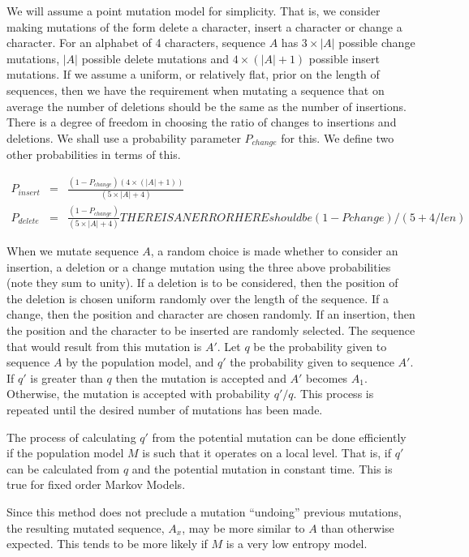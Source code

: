 \documentclass[letterpaper,11pt,oneside]{article}
\begin{document}
We will assume a point mutation model for simplicity.  That is, we consider
making mutations of the form delete a character, insert a character or change
a character.  For an alphabet of 4 characters, sequence $A$ has $3\times|A|$
possible change mutations, $|A|$ possible delete mutations and
$4\times(|A|+1)$ possible insert mutations.  If we assume a uniform, or
relatively flat, prior on the length of sequences, then we have the
requirement when mutating a sequence that on average the number of deletions
should be the same as the number of insertions.  There is a degree of freedom
in choosing the ratio of changes to insertions and deletions.  We shall use a
probability parameter $P_{change}$ for this.  We define two other probabilities
in terms of this.

\begin{eqnarray*}
P_{insert} & = & \frac{(1-P_{change})(4\times(|A|+1))}{(5\times|A|+4)} \\
P_{delete} & = & \frac{(1-P_{change})}{(5\times|A|+4)}
THERE IS AN ERROR HERE  should be (1-Pchange) / (5 + 4/len)
\end{eqnarray*}

When we mutate sequence $A$, a random choice is made whether to consider an
insertion, a deletion or a change mutation using the three above probabilities
(note they sum to unity).  If a deletion is to be considered, then the
position of the deletion is chosen uniform randomly over the length of the
sequence.  If a change, then the position and character are chosen randomly.
If an insertion, then the position and the character to be inserted are
randomly selected.  The sequence that would result from this mutation is $A'$.
Let $q$ be the probability given to sequence $A$ by the population model, and
$q'$ the probability given to sequence $A'$.  If $q'$ is greater than $q$ then
the mutation is accepted and $A'$ becomes $A_1$.  Otherwise, the mutation is
accepted with probability $q'/q$.  This process is repeated until the desired
number of mutations has been made.

The process of calculating $q'$ from the potential mutation can be done
efficiently if the population model $M$ is such that it operates on a local
level.  That is, if $q'$ can be calculated from $q$ and the potential mutation
in constant time.  This is true for fixed order Markov Models.

Since this method does not preclude a mutation ``undoing'' previous mutations,
the resulting mutated sequence, $A_x$, may be more similar to $A$ than
otherwise expected.  This tends to be more likely if $M$ is a very low entropy
model.
\end{document}
